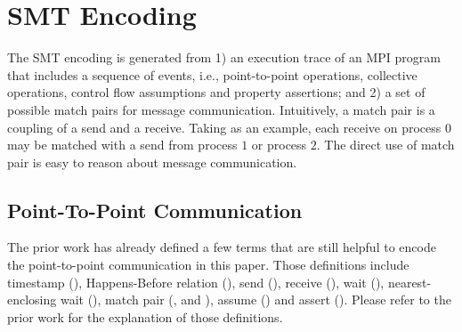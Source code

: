 \section{SMT Encoding}
The SMT encoding is generated from 1) an execution trace of an MPI program that includes a sequence of events, i.e., point-to-point operations, collective operations, control flow assumptions and property assertions; and 2) a set of possible match pairs for message communication. Intuitively, a match pair is a coupling of a send and a receive. Taking  as an example, each receive on process $0$ may be matched with a send from process $1$ or process $2$. The direct use of match pair is easy to reason about message communication. 

\subsection{Point-To-Point Communication}
The prior work has already defined a few terms that are still helpful to encode the point-to-point communication in this paper. Those definitions include timestamp (), Happens-Before relation (), send (), receive (), wait (), nearest-enclosing wait (), match pair (,  and ), assume () and assert (). Please refer to the prior work \cite{DBLP:conf/kbse/HuangMM13} for the explanation of those definitions.

%
%


